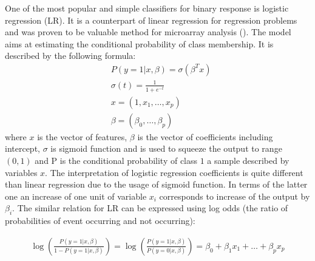 \documentclass[12pt, wide]{mwart}
\begin{document}
One of the most popular and simple classifiers for binary response is logistic regression (LR). It is a counterpart of linear regression for regression problems and was proven to be valuable method for microarray analysis (\cite{LRgene}). The model aims at estimating the conditional probability of class membership. It is described by the following formula:
\begin{align*}
    &P(y=1 | x, \beta)=\sigma\left(\beta^{T} x\right) \\
    &\sigma(t) = \frac{1}{1+e^{-t}} \\
    &x=(1, x_1, \ldots, x_p) \\
    &\beta = (\beta_0, \ldots, \beta_p)
\end{align*}
where $x$ is the vector of features, $\beta$ is the vector of coefficients including intercept, $\sigma$ is sigmoid function and is used to squeeze the output to range $(0,1)$ and P is the conditional probability of class $1$ a sample described by variables $x$. The interpretation of logistic regression coefficients is quite different than linear regression due to the usage of sigmoid function. In terms of the latter one an increase of one unit of variable $x_i$ corresponds to increase of the output by $\beta_i$. The similar relation for LR can be expressed using log odds (the ratio of probabilities of event occurring and not occurring):

\begin{align*}
    \log \left(\frac{P(y=1| x, \beta)}{1-P(y=1| x, \beta)}\right)=\log \left(\frac{P(y=1| x, \beta)}{P(y=0| x, \beta)}\right)=\beta_{0}+\beta_{1} x_{1}+\ldots+\beta_{p} x_{p}
\end{align*}
\end{document}
